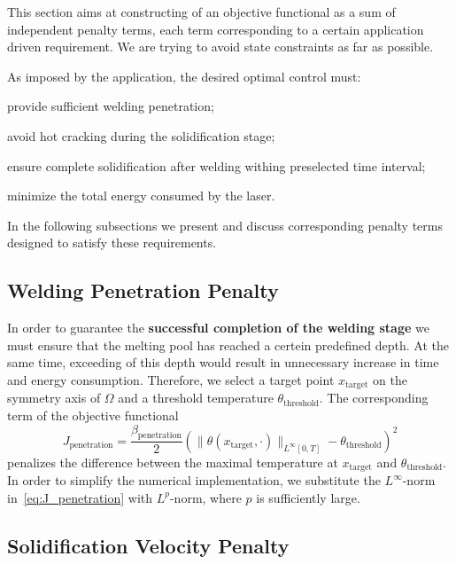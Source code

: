 This section aims at constructing of an objective functional as a sum of independent penalty terms, each term corresponding to a certain application driven requirement.
We are trying to avoid state constraints as far as possible.

As imposed by the application, the desired optimal control must:
\begin{enumeratearabic}
	\item provide sufficient welding penetration;
	\item avoid hot cracking during the solidification stage;
	\item ensure complete solidification after welding withing preselected time interval;
	\item minimize the total energy consumed by the laser.
\end{enumeratearabic}

In the following subsections we present and discuss corresponding penalty terms designed to satisfy these requirements.


\subsection{Welding Penetration Penalty}
\label{subsec:welding_penetration}

In order to guarantee the \textbf{successful completion of the welding stage} we must ensure that the melting pool has reached a certein predefined depth. At the same time, exceeding of this depth would result in unnecessary increase in time and energy consumption. Therefore, we select a target point $x_{\text{target}}$ on the symmetry axis of $\Omega$ and a threshold temperature $\theta_{\text{threshold}}$. The corresponding term of the objective functional
\begin{equation} \label{eq:J_penetration}
	J_{\text{penetration}} = \frac{\beta_\text{penetration}}{2} \left( \| \theta(x_{\text{target}},\cdot) \|_{L^{\infty}[0,T]} - \theta_{\text{threshold}} \right)^2
\end{equation}
penalizes the difference between the maximal temperature at $x_{\text{target}}$ and $\theta_{\text{threshold}}$. In order to simplify the numerical implementation, we substitute the $L^{\infty}$-norm in~\eqref{eq:J_penetration} with $L^{p}$-norm, where $p$ is sufficiently large.


\subsection{Solidification Velocity Penalty}
\label{subsec:velocity}

